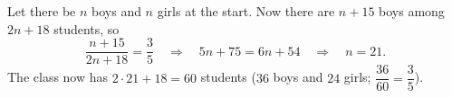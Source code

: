 Let there be $n$ boys and $n$ girls at the start. Now there are $n+15$ boys among $2n+18$ students, so
\[\dfrac{n+15}{2n+18}=\dfrac{3}{5}\quad\Longrightarrow\quad5n+75=6n+54\quad\Longrightarrow\quad n=21 .\]
The class now has $2\cdot21+18=\boxed{60}$ students ($36$ boys and $24$ girls; $\dfrac{36}{60}=\dfrac{3}{5}$).
